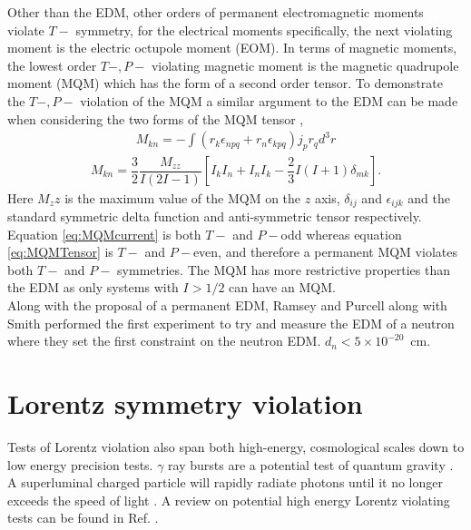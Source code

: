 \documentclass[10pt,a4paper, twoside]{report}
\begin{document}
Other than the EDM, other orders of permanent electromagnetic moments violate $T-$ symmetry, for the electrical moments specifically, the next violating moment is the electric octupole moment (EOM). In terms of magnetic moments, the lowest order $T-,P-$ violating magnetic moment is the magnetic quadrupole moment (MQM) which has the form of a second order tensor. To demonstrate the $T-,P-$ violation of the MQM a similar argument to the EDM can be made when considering the two forms of the MQM tensor \cite{SFK1984},
\begin{align} \label{eq:MQMcurrent}
M_{kn} = - \int \left( r_k \epsilon_{npq} + r_n\epsilon_{kpq} \right)j_pr_q d^3r
\end{align}
\begin{align} \label{eq:MQMTensor}
M_{kn} = \dfrac{3}{2}\dfrac{M_{zz}}{I(2I-1)}\left[I_{k}I_{n} + I_{n}I_{k} - \dfrac{2}{3}I(I+1)\delta_{mk}\right].
\end{align}
Here $M_zz$ is the maximum value of the MQM on the $z$ axis, $\delta_{ij}$ and $\epsilon_{ijk}$ and the standard symmetric delta function and anti-symmetric tensor respectively. Equation \ref{eq:MQMcurrent} is both $T-$ and $P-$odd whereas equation \ref{eq:MQMTensor} is $T-$ and $P-$even, and therefore a permanent MQM violates both $T-$ and $P-$ symmetries. The MQM has more restrictive properties than the EDM as only systems with $I>1/2$ can have an MQM. \\
\linebreak
Along with the proposal of a permanent EDM, Ramsey and Purcell along with Smith performed the first experiment to try and measure the EDM of a neutron \cite{Smith1957} where they set the first constraint on the neutron EDM. $d_n < 5 \times 10^{-20}$~cm. 
\section{Lorentz symmetry violation} \label{sec:Lorentz}
Tests of Lorentz violation also span both high-energy, cosmological scales down to low energy precision tests. $\gamma$ ray bursts are a potential test of quantum gravity  \cite{Amelino1998}. A superluminal charged particle will rapidly radiate photons until it no longer exceeds the speed of light \cite{Coleman1997}. A review on potential high energy Lorentz violating tests can be found in Ref. \cite{Coleman1999}. 
\end{document}
